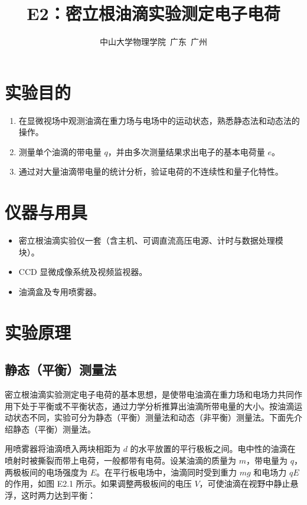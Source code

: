 \documentclass[a4paper,8pt,twocolumn]{article}
\title{
  \textbf{\huge E2：密立根油滴实验测定电子电荷}}
\author{
\small 中山大学物理学院~广东~广州
}
\begin{document}
\maketitle
\newpage

\section{实验目的}
\begin{enumerate}
  \item 在显微视场中观测油滴在重力场与电场中的运动状态，熟悉静态法和动态法的操作。
  \item 测量单个油滴的带电量 $q$，并由多次测量结果求出电子的基本电荷量 $e$。
  \item 通过对大量油滴带电量的统计分析，验证电荷的不连续性和量子化特性。
\end{enumerate}

\section{仪器与用具}
\begin{itemize}
  \item 密立根油滴实验仪一套（含主机、可调直流高压电源、计时与数据处理模块）。
  \item CCD 显微成像系统及视频监视器。
  \item 油滴盒及专用喷雾器。
\end{itemize}

\section{实验原理}

\subsection{静态（平衡）测量法}

密立根油滴实验测定电子电荷的基本思想，是使带电油滴在重力场和电场力共同作用下处于平衡或不平衡状态，通过力学分析推算出油滴所带电量的大小。按油滴运动状态不同，实验可分为静态（平衡）测量法和动态（非平衡）测量法。下面先介绍静态（平衡）测量法。

用喷雾器将油滴喷入两块相距为 $d$ 的水平放置的平行极板之间。电中性的油滴在喷射时被撕裂而带上电荷，一般都带有电荷。设某油滴的质量为 $m$，带电量为 $q$，两极板间的电场强度为 $E$。在平行板电场中，油滴同时受到重力 $mg$ 和电场力 $qE$ 的作用，如图 E2.1 所示。如果调整两极板间的电压 $V$，可使油滴在视野中静止悬浮，这时两力达到平衡：
\end{document}
